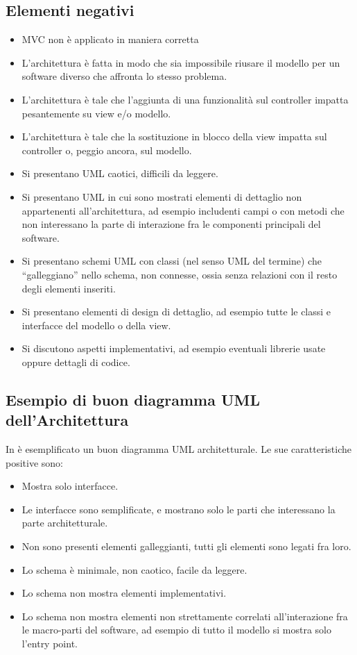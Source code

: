 \documentclass[a4paper,12pt]{report}
\begin{document}
\subsection*{Elementi negativi}
\begin{itemize}
 \item MVC non è applicato in maniera corretta
 \item L'architettura è fatta in modo che sia impossibile riusare il modello per un software diverso che affronta lo stesso problema.
 \item L'architettura è tale che l'aggiunta di una funzionalità sul controller impatta pesantemente su view e/o modello.
 \item L'architettura è tale che la sostituzione in blocco della view impatta sul controller o, peggio ancora, sul modello.
 \item Si presentano UML caotici, difficili da leggere.
 \item Si presentano UML in cui sono mostrati elementi di dettaglio non appartenenti all'architettura, ad esempio includenti campi o con metodi che non interessano la parte di interazione fra le componenti principali del software.
 \item Si presentano schemi UML con classi (nel senso UML del termine) che ``galleggiano'' nello schema, non connesse, ossia senza relazioni con il resto degli elementi inseriti.
 \item Si presentano elementi di design di dettaglio, ad esempio tutte le classi e interfacce del modello o della view.
 \item Si discutono aspetti implementativi, ad esempio eventuali librerie usate oppure dettagli di codice.
\end{itemize}

\subsection*{Esempio di buon diagramma UML dell'Architettura}
In  è esemplificato un buon diagramma UML architetturale.
%
Le sue caratteristiche positive sono:
\begin{itemize}
	\item Mostra solo interfacce.
	\item Le interfacce sono semplificate, e mostrano solo le parti che interessano la parte architetturale.
	\item Non sono presenti elementi galleggianti, tutti gli elementi sono legati fra loro.
	\item Lo schema è minimale, non caotico, facile da leggere.
	\item Lo schema non mostra elementi implementativi.
	\item Lo schema non mostra elementi non strettamente correlati all'interazione fra le macro-parti del software, ad esempio di tutto il modello si mostra solo l'entry point.
\end{itemize}
\end{document}
